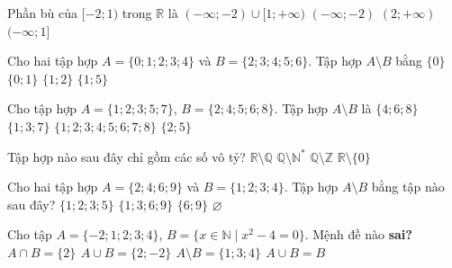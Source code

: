 \begin{ex}%
	Phần bù của $[-2;1)$ trong $\mathbb{R}$ là 
	 \choice
		{\True $(-\infty;-2) \cup  [1;+\infty)$}
		{$(-\infty;-2)$} 
		 {$(2;+\infty)$}
		 {$(-\infty;1]$}
	\loigiai{ 
	Ta có $\mathbb{R} \setminus [-2;1)=(-\infty;-2) \cup [1;+\infty)$.} 
\end{ex}

\begin{ex}%
	 Cho hai tập hợp $A=\{0;1;2;3;4\}$ và $B=\{2;3;4;5;6\}$. Tập hợp $A \setminus B$ bằng
	 \choice
		 {$\{0\}$}
		{\True $\{0;1\}$} 
		{  $\{1;2\}$}
		{$\{1;5\}$} 
\end{ex}

\begin{ex}%
	Cho tập hợp  $A=\{1;2;3;5;7\}$, $B=\{2;4;5;6;8\}$. Tập hợp $A \setminus B$ là
	 \choice
		 {$\{4;6;8\}$}
		{\True $\{1;3;7\}$} 
		{$\{1;2;3;4;5;6;7;8\}$} 
		{  $\{2;5\}$}
\end{ex}

\begin{ex}%
	Tập hợp nào sau đây chỉ gồm các số vô  tỷ?
	\choice 
		 {\True $\mathbb{R} \setminus \mathbb{Q}$}
		{$\mathbb{Q} \setminus \mathbb{N}^*$} 
		 {$\mathbb{Q} \setminus \mathbb{Z}$}
		{$\mathbb{R} \setminus  \{0\}$}
\end{ex}

\begin{ex}%
	Cho hai tập hợp  $A=\{2;4;6;9\}$ và $B=\{1;2;3;4\}$. Tập hợp $A \setminus B$ bằng tập nào sau đây?
	\choice 
		{$\{1;2;3;5\}$} 
		{$\{1;3;6;9\}$} 
		{\True $\{6;9\}$} 
		 {$\varnothing$}
\end{ex}

\begin{ex}%
	Cho tập $A=\{-2;1;2;3;4\}$, $B=\{x \in  \mathbb{N} \mid x^2-4=0\}$. Mệnh đề nào \bf{sai}?
	\choice 
		{\True  $A \cap B=\{2\}$}
		{$A \cup  B=\{2;-2\}$}
		{$A \setminus B=\{1;3;4\}$} 
		{$A  \cup B=B$}
\end{ex}

